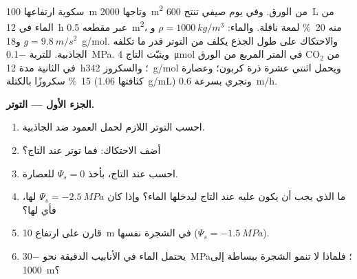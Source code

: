 \begin{problem}
\label{pb:b1:plant-transport:1}
سكوية ارتفاعها \qty{100}{m} وتاجها \qty{2000}{m^2} من الورق. وفي
يوم صيفي تنتح \qty{600}{L} من الماء في \qty{12}{h} عبر  مقطعه
\qty{0.5}{m^2}، منه \qty{20}{\%} لمعة ناقلة. والماء:
$\rho = \qty{1000}{kg/m^3}$ و$g =
\qty{9.8}{m/s^2}$ و\qty{18}{g/mol}.
والاحتكاك على طول الجذع يكلف من التوتر قدر ما تكلفه الجاذبية.
 للتربة \qty{-0.1}{MPa}. ويثبّت التاج
\qty{4}{\micro mol} من $\mathrm{CO_2}$ في المتر المربع من الورق في
الثانية مدة \qty{12}{h}؛ والسكروز \qty{342}{g/mol} ويحمل اثنتي عشرة
ذرة كربون؛ وعصارة  \qty{15}{\%} سكروزًا بالكتلة (كثافتها
\qty{1.06}{g/mL}) وتجري بسرعة \qty{0.6}{m/h}.

\medskip
\noindent\textbf{الجزء الأول --- التوتر.}
\begin{enumerate}
  \item احسب التوتر اللازم لحمل العمود ضد الجاذبية.
  \item أضف الاحتكاك: فما توتر  عند التاج؟
  \item احسب   عند التاج، بأخذ $\Psi_s = 0$
        للعصارة.
  \item ما الذي يجب أن يكون عليه    عند
        التاج ليدخلها الماء؟ وإذا كان $\Psi_s = \qty{-2.5}{MPa}$
        لها، فأي  لها؟
  \item قارن  على ارتفاع \qty{10}{m} في الشجرة نفسها
        ($\Psi_s =
        \qty{-1.5}{MPa}$).
  \item يحتمل الماء في الأنابيب الدقيقة نحو \qty{-30}{MPa}؛ فلماذا
        لا تنمو الشجرة ببساطة إلى \qty{1000}{m}؟
\end{enumerate}


\end{problem}
